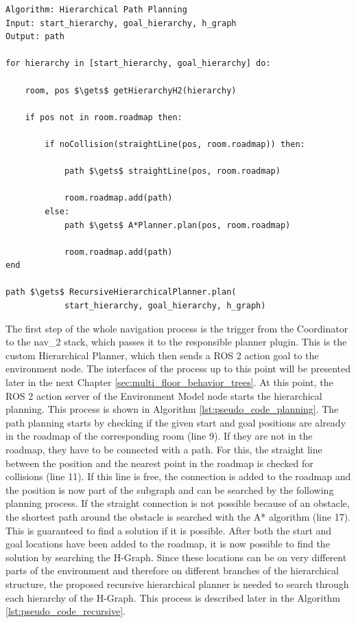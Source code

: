 \begin{lstlisting}[float=h]
Algorithm: Hierarchical Path Planning
Input: start_hierarchy, goal_hierarchy, h_graph
Output: path

for hierarchy in [start_hierarchy, goal_hierarchy] do:

    room, pos $\gets$ getHierarchyH2(hierarchy)
    
    if pos not in room.roadmap then:
    
        if noCollision(straightLine(pos, room.roadmap)) then:
        
            path $\gets$ straightLine(pos, room.roadmap)
            
            room.roadmap.add(path)
        else:
            path $\gets$ A*Planner.plan(pos, room.roadmap)
            
            room.roadmap.add(path)
end

path $\gets$ RecursiveHierarchicalPlanner.plan(
            start_hierarchy, goal_hierarchy, h_graph)

\end{lstlisting}

The first step of the whole navigation process is the trigger from the Coordinator to the \gls{nav_2} stack, which passes it to the responsible planner plugin. This is the custom Hierarchical Planner, which then sends a ROS 2 action goal to the environment node. The interfaces of the process up to this point will be presented later in the next Chapter \ref{sec:multi_floor_behavior_trees}. At this point, the ROS 2 action server of the Environment Model node starts the hierarchical planning. This process is shown in Algorithm \ref{lst:pseudo_code_planning}. The path planning starts by checking if the given start and goal positions are already in the roadmap of the corresponding room (line 9). If they are not in the roadmap, they have to be connected with a path. For this, the straight line between the position and the nearest point in the roadmap is checked for collisions (line 11). If this line is free, the connection is added to the roadmap and the position is now part of the subgraph and can be searched by the following planning process. If the straight connection is not possible because of an obstacle, the shortest path around the obstacle is searched with the A* algorithm (line 17). This is guaranteed to find a solution if it is possible. After both the start and goal locations have been added to the roadmap, it is now possible to find the solution by searching the H-Graph. Since these locations can be on very different parts of the environment and therefore on different branches of the hierarchical structure, the proposed recursive hierarchical planner is needed to search through each hierarchy of the H-Graph. This process is described later in the Algorithm \ref{lst:pseudo_code_recursive}.

